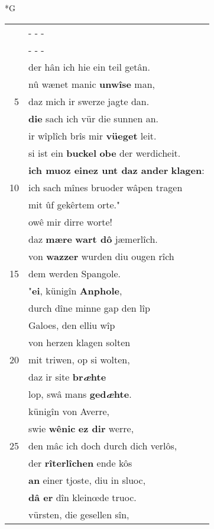 \documentclass[8pt,a4paper,notitlepage]{article}
\begin{document}
\begin{table}[ht]
\begin{minipage}[t]{0.5\linewidth}
\small
\begin{center}*G
\end{center}
\begin{tabular}{rl}
 & \multicolumn{1}{l}{ - - - }\\ 
 & \multicolumn{1}{l}{ - - - }\\ 
 & der hân ich hie ein teil getân.\\ 
 & nû wænet manic \textbf{unwîse} man,\\ 
5 & daz mich ir swerze jagte dan.\\ 
 & \textbf{die} sach ich vür die sunnen an.\\ 
 & ir wîplîch brîs mir \textbf{vüeget} leit.\\ 
 & si ist ein \textbf{buckel} \textbf{obe} der werdicheit.\\ 
 & \textbf{ich muoz einez unt daz ander} \textbf{klagen}:\\ 
10 & ich sach mînes bruoder wâpen tragen\\ 
 & mit ûf gekêrtem orte."\\ 
 & owê mir dirre worte!\\ 
 & daz \textbf{mære} \textbf{wart dô} jæmerlîch.\\ 
 & von \textbf{wazzer} wurden diu ougen rîch\\ 
15 & dem werden Spangole.\\ 
 & "\textbf{ei}, künigîn \textbf{Anphole},\\ 
 & durch dîne minne gap den lîp\\ 
 & Galoes, den elliu wîp\\ 
 & von herzen klagen solten\\ 
20 & mit triwen, op si wolten,\\ 
 & daz ir site \textbf{br\textit{æ}hte}\\ 
 & lop, swâ mans \textbf{ged\textit{æ}hte}.\\ 
 & künigîn von Averre,\\ 
 & swie \textbf{wênic} \textbf{ez dir} werre,\\ 
25 & den mâc ich doch durch dich verlôs,\\ 
 & der \textbf{rîterlîchen} ende kôs\\ 
 & \textbf{an} einer tjoste, diu in sluoc,\\ 
 & \textbf{dâ er} dîn kleinœde truoc.\\ 
 & vürsten, die gesellen sîn,\\ 

\end{tabular}
\end{minipage}
\end{table}
\end{document}
